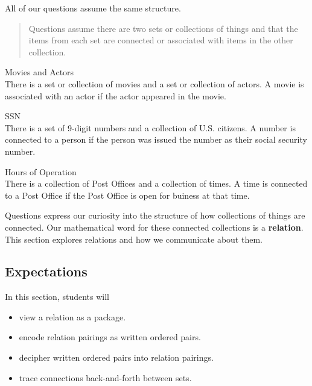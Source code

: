 \documentclass{ximera}
\begin{document}
All of our questions assume the same structure.  \\


\begin{quote}
Questions assume there are two sets or collections of things and that the items from each set are connected or associated with items in the other collection.  
\end{quote}


\begin{example} Movies and Actors \\
There is a set or collection of movies and a set or collection of actors.  A movie is associated with an actor if the actor appeared in the movie.
\end{example}

\begin{example} SSN \\
There is a set of 9-digit numbers and a collection of U.S. citizens.  A number is connected to a person if the person was issued the number as their social security number.
\end{example}

\begin{example} Hours of Operation \\
There is a collection of Post Offices and a collection of times.  A time is connected to a Post Office if the Post Office is open for buiness at that time.
\end{example}




Questions express our curiosity into the structure of how collections of things are connected. Our mathematical word for these connected collections is a \textbf{\textcolor{blue!75!black}{relation}}. \\


This section explores relations and how we communicate about them. \\










\subsection{Expectations}

\begin{sectionOutcomes}
In this section, students will 

\begin{itemize}
\item view a relation as a package.
\item encode relation pairings as written ordered pairs.
\item decipher written ordered pairs into relation pairings.
\item trace connections back-and-forth between sets.
\end{itemize}
\end{sectionOutcomes}
\end{document}
